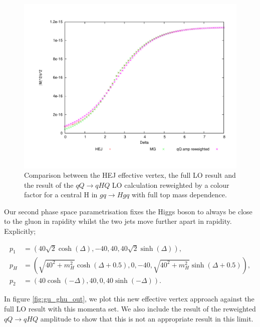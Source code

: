 \begin{figure}[t]
\centering
\includegraphics[scale=0.5]{Images/qg_qgH_central.pdf}
\caption{Comparison between the HEJ effective vertex, the full LO result and the result of the $qQ \to qHQ$ LO calculation reweighted by a colour factor for a central H in $gq \to Hgq$ with full top mass dependence.}
\label{fig:gu_ghu_cen}
\end{figure}
Our second phase space parametrisation fixes the Higgs boson to always be close to the gluon in rapidity whilst the two jets move further apart in rapidity. Explicitly; 

\begin{subequations}
\begin{align}
p_1 &= (40 \sqrt{2} \cosh(\Delta),-40,40,40 \sqrt{2} \sinh(\Delta)), \\
p_H &= (\sqrt{40^2+m_H^2} \cosh(\Delta+0.5), 0,-40,\sqrt{40^2+m_H^2}  \sinh(\Delta + 0.5)), \\
p_2 &= (40 \cosh(-\Delta),40,0,40 \sinh(-\Delta)).
\end{align}
\end{subequations}

In figure \ref{fig:gu_ghu_out}, we plot this new effective vertex approach against the full LO result with this momenta set. We also include the result of the reweighted $qQ \to qHQ$ amplitude to show that this is not an appropriate result in this limit. 

